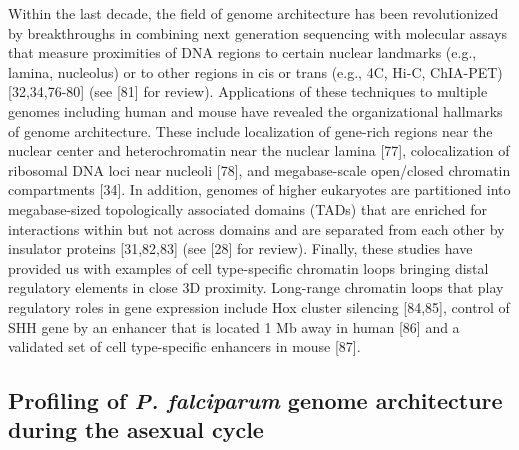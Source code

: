 Within the last decade, the field of genome architecture has been
revolutionized by breakthroughs in combining next generation sequencing with
molecular assays that measure proximities of DNA regions to certain nuclear
landmarks (e.g., lamina, nucleolus) or to other regions in cis or trans (e.g.,
4C, Hi-C, ChIA-PET) [32,34,76-80] (see [81] for review). Applications of these
techniques to multiple genomes including human and mouse have revealed the
organizational hallmarks of genome architecture. These include localization of
gene-rich regions near the nuclear center and heterochromatin near the nuclear
lamina [77], colocalization of ribosomal DNA loci near nucleoli [78], and
megabase-scale open/closed chromatin compartments [34]. In addition, genomes
of higher eukaryotes are partitioned into megabase-sized topologically
associated domains (TADs) that are enriched for interactions within but not
across domains and are separated from each other by insulator proteins
[31,82,83] (see [28] for review). Finally, these studies have provided us with
examples of cell type-specific chromatin loops bringing distal regulatory
elements in close 3D proximity. Long-range chromatin loops that play
regulatory roles in gene expression include Hox cluster silencing [84,85],
control of SHH gene by an enhancer that is located 1 Mb away in human [86] and
a validated set of cell type-specific enhancers in mouse [87].

\subsection{Profiling of \textit{P. falciparum} genome architecture during the asexual
cycle}

